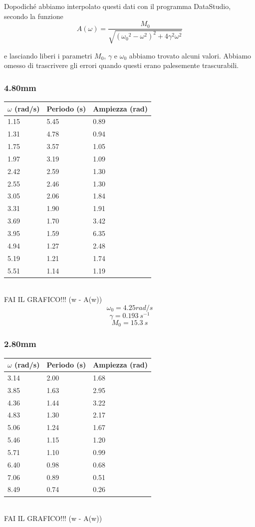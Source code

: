 \documentclass[a4paper,10pt]{report}
\begin{document}
Dopodiché abbiamo interpolato questi dati con il programma DataStudio, secondo la funzione
$$ A(\omega) = \frac{M_0}{\sqrt{ ({\omega_0}^2-\omega^2)^2 + 4\gamma^2\omega^2}} $$

e lasciando liberi i parametri $M_0$, $\gamma$ e $\omega_0$ abbiamo trovato alcuni valori. Abbiamo omesso di trascrivere gli errori quando questi erano palesemente trascurabili.
\\
\subsubsection{4.80mm}
\begin{tabular}{l|l|l}
$\omega$ (rad/s) & Periodo (s) & Ampiezza (rad) \\
\midrule
1.15	& 5.45 & 0.89\\
1.31	& 4.78 & 0.94\\
1.75	& 3.57 & 1.05\\
1.97	& 3.19 & 1.09\\
2.42	& 2.59 & 1.30\\
2.55	& 2.46 & 1.30\\
3.05    & 2.06 & 1.84\\
3.31	& 1.90 & 1.91\\
3.69	& 1.70 & 3.42\\
3.95	& 1.59 & 6.35\\
4.94	& 1.27 & 2.48\\
5.19	& 1.21 & 1.74\\
5.51	& 1.14 & 1.19 \\
\midrule
\end{tabular}
\\
FAI IL GRAFICO!!! (w - A(w))
\\

$$ \omega_0 = 4.25 rad/s $$
$$ \gamma = 0.193\ s^{-1}$$
$$ M_0 = 15.3\ s$$

\subsubsection{2.80mm}
\begin{tabular}{l|l|l}
$\omega$ (rad/s) & Periodo (s) & Ampiezza (rad) \\
\midrule
3.14 & 2.00 & 1.68 \\
3.85 & 1.63 & 2.95 \\
4.36 & 1.44 & 3.22 \\
4.83 & 1.30 & 2.17 \\
5.06 & 1.24 & 1.67 \\
5.46 & 1.15 & 1.20 \\
5.71 & 1.10 & 0.99 \\
6.40 & 0.98 & 0.68 \\
7.06 & 0.89 & 0.51 \\
8.49 & 0.74 & 0.26 \\
\midrule
\end{tabular}
\\
FAI IL GRAFICO!!! (w - A(w))
\\
\end{document}
